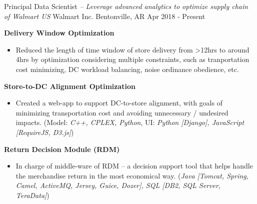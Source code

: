 

\begin{cventries}


\cventry
{Principal Data Scientist \textit{ -- Leverage advanced analytics to optimize supply chain of Walmart US}}          %
{Walmart Inc.}                      %
{Bentonville, AR}                   %
{Apr 2018 - Present}                    %
{
    \begin{cvitems}
    \item {
        \textbf{Delivery Window Optimization}  
        \begin{itemize}
            \item  Reduced the length of time window of store delivery from >12hrs to around 4hrs by optimization considering
             multiple constraints, such as tranportation cost minimizing, DC workload balancing, noise ordinance obedience, etc. 
        \end{itemize}           
    }
    \item {
        \textbf{Store-to-DC Alignment Optimization} 
        \begin{itemize}
            \item  Created a web-app to support DC-to-store alignment, with goals of minimizing transportation cost and avoiding unnecessary / undesired impacts. 
            (Model: \textit{C++, CPLEX, Python}, UI: \textit{Python [Django], JavaScript [RequireJS, D3.js]}) 
        \end{itemize}           
    }
    \item {
        \textbf{Return Decision Module (RDM)} 
        \begin{itemize}
            \item  In charge of middle-ware of RDM -- a decision support tool that helps handle the merchandise return in the most economical way. 
                   (\textit{Java [Tomcat, Spring, Camel, ActiveMQ, Jersey, Guice, Dozer], SQL [DB2, SQL Server, TeraData]})
        \end{itemize}           
    }
    \end{cvitems}%
}


\end{cventries}
